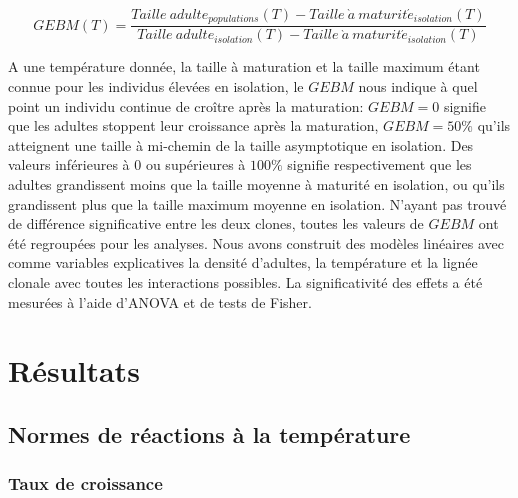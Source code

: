 \begin{equation}
GEBM(T) = \frac{Taille\ adulte_{populations}(T) -
Taille\ \grave{a} \ maturit\acute{e}_{isolation}(T)}{Taille\ adulte_{isolation}(T) -
Taille\ \grave{a} \ maturit\acute{e}_{isolation}(T)}
\end{equation}

A une température donnée, la taille à maturation et la taille maximum étant
connue pour les individus élevées en isolation, le $GEBM$ nous indique à quel
point un individu continue de croître après la maturation: $GEBM=0$ signifie que
les adultes stoppent leur croissance après la maturation, $GEBM=50\%$ qu'ils
atteignent une taille à mi-chemin de la taille asymptotique en isolation. Des
valeurs inférieures à 0 ou supérieures à $100\%$ signifie respectivement que les
adultes grandissent moins que la taille moyenne à maturité en isolation, ou
qu'ils grandissent plus que la taille maximum moyenne en isolation. N'ayant pas
trouvé de différence significative entre les deux clones, toutes les valeurs de
$GEBM$ ont été regroupées pour les analyses. Nous avons construit des modèles
linéaires avec comme variables explicatives la densité d'adultes, la
température et la lignée clonale avec toutes les interactions possibles. La
significativité des effets a été mesurées à l'aide d'ANOVA et de tests de
Fisher.

\section{Résultats}

\subsection{Normes de réactions à la température}

\subsubsection{Taux de croissance}

